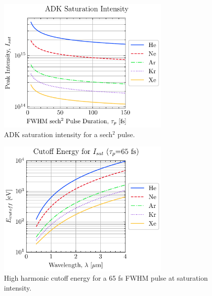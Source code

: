 \begin{figure}
	\centering
	\includegraphics[width=0.75\textwidth]{figures/chap1/saturation_intensity.pdf}
	\caption{ADK saturation intensity for a sech$^2$ pulse.}
	\label{fig:saturation_intensity}
\end{figure}

\begin{figure}
	\centering
	\includegraphics[width=0.75\textwidth]{figures/chap1/saturation_intensity_cutoff.pdf}
	\caption{High harmonic cutoff energy for a 65 fs FWHM pulse at saturation intensity.}
	\label{fig:saturation_intensity_cutoff}
\end{figure}


